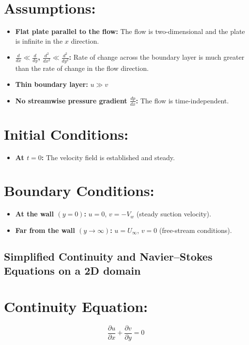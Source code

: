 \documentclass{article}
\begin{document}
\section*{Assumptions:}
\begin{itemize}
    \item \textbf{Flat plate parallel to the flow:} The flow is two-dimensional and the plate is infinite in the \(x\) direction.
    \item \textbf{\(\frac{d}{dx} \ll \frac{d}{dy}\), \(\frac{d^2}{dx^2} \ll \frac{d^2}{dy^2}\):} Rate of change across the boundary layer is much greater than the rate of change in the flow direction.
    \item \textbf{Thin boundary layer:} \(u \gg v\)
    \item \textbf{No streamwise pressure gradient \(\frac{dp}{dx}\):} The flow is time-independent.
\end{itemize}

\section*{Initial Conditions:}
\begin{itemize}
    \item \textbf{At \(t = 0\):} The velocity field is established and steady.
\end{itemize}

\section*{Boundary Conditions:}
\begin{itemize}
    \item \textbf{At the wall \((y = 0)\):} \(u = 0\), \(v = -V_w\) (steady suction velocity).
    \item \textbf{Far from the wall \((y \rightarrow \infty)\):} \(u = U_\infty\), \(v = 0\) (free-stream conditions).
\end{itemize}

\subsection{Simplified Continuity and Navier–Stokes Equations on a 2D domain}

\section*{Continuity Equation:}
\[
\frac{\partial u}{\partial x} + \frac{\partial v}{\partial y} = 0
\]
\end{document}
